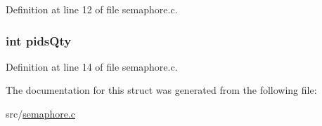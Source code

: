 Definition at line 12 of file semaphore.c.

\hypertarget{structsem_queue_a9d456afc79beb2848acfed9c69887f8a}{
\subsubsection[{pidsQty}]{\setlength{\rightskip}{0pt plus 5cm}int {\bf pidsQty}}}
\label{structsem_queue_a9d456afc79beb2848acfed9c69887f8a}


Definition at line 14 of file semaphore.c.



The documentation for this struct was generated from the following file:\begin{DoxyCompactItemize}
\item 
src/\hyperlink{semaphore_8c}{semaphore.c}\end{DoxyCompactItemize}
